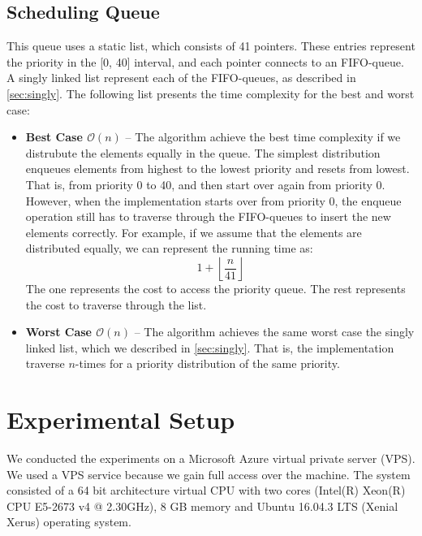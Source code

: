 \documentclass[a4paper,11pt]{kth-mag}
\newcommand\floor[1]{\lfloor#1\rfloor}
\begin{document}
\subsection{Scheduling Queue}
This queue uses a static list, which consists of 41 pointers.
These entries represent the priority in the [0, 40] interval, and each pointer connects to an FIFO-queue.
A singly linked list represent each of the FIFO-queues, as described in \cref{sec:singly}.
The following list presents the time complexity for the best and worst case:
\begin{itemize}
    \item \textbf{Best Case $\mathcal{O}(n)$} -- The algorithm achieve the best time complexity if we distrubute the elements equally in the queue.
        The simplest distribution enqueues elements from highest to the lowest priority and resets from lowest.
        That is, from priority 0 to 40, and then start over again from priority 0.
        However, when the implementation starts over from priority 0, the enqueue operation still has to traverse through the FIFO-queues to insert the new elements correctly.
        For example, if we assume that the elements are distributed equally, we can represent the running time as:
        \begin{equation*}
            1 + \left\floor{\frac{n}{41}\right}
        \end{equation*}
        The one represents the cost to access the priority queue.
        The rest represents the cost to traverse through the list.
    \item \textbf{Worst Case $\mathcal{O}(n)$} -- The algorithm achieves the same worst case the singly linked list, which we described in \cref{sec:singly}.
        That is, the implementation traverse $n$-times for a priority distribution of the same priority.
\end{itemize}



\section{Experimental Setup}
We conducted the experiments on a Microsoft Azure virtual private server (VPS).
We used a VPS service because we gain full access over the machine.
The system consisted of a 64 bit architecture virtual CPU with two cores (Intel(R) Xeon(R) CPU E5-2673 v4 @ 2.30GHz), 8 GB memory and Ubuntu 16.04.3 LTS (Xenial Xerus) operating system.
\end{document}

